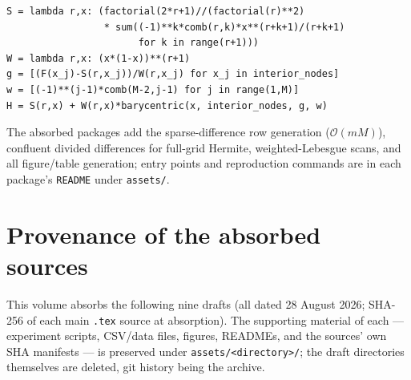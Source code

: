 \documentclass[11pt,oneside]{article}
\numberwithin{equation}{section}
\theoremstyle{definition}
\theoremstyle{remark}
\newcommand{\bigO}{\mathcal O}
\begin{document}
\begin{lstlisting}[style=pythonstyle,caption={Endpoint-flat
interpolation in barycentric form (\cref{thm:factorization}).}]
S = lambda r,x: (factorial(2*r+1)//(factorial(r)**2)
                 * sum((-1)**k*comb(r,k)*x**(r+k+1)/(r+k+1)
                       for k in range(r+1)))
W = lambda r,x: (x*(1-x))**(r+1)
g = [(F(x_j)-S(r,x_j))/W(r,x_j) for x_j in interior_nodes]
w = [(-1)**(j-1)*comb(M-2,j-1) for j in range(1,M)]
H = S(r,x) + W(r,x)*barycentric(x, interior_nodes, g, w)
\end{lstlisting}

The absorbed packages add the sparse-difference row generation
($\bigO(mM)$), confluent divided differences for full-grid Hermite,
weighted-Lebesgue scans, and all figure/table generation; entry
points and reproduction commands are in each package's
\nolinkurl{README} under \nolinkurl{assets/}.

\section{Provenance of the absorbed sources}
\label{app:provenance}

This volume absorbs the following nine drafts (all dated 28 August
2026; SHA-256 of each main \texttt{.tex} source at absorption).  The
supporting material of each --- experiment scripts, CSV/data files,
figures, READMEs, and the sources' own SHA manifests --- is preserved
under \nolinkurl{assets/<directory>/}; the draft directories
themselves are deleted, git history being the archive.
\end{document}
